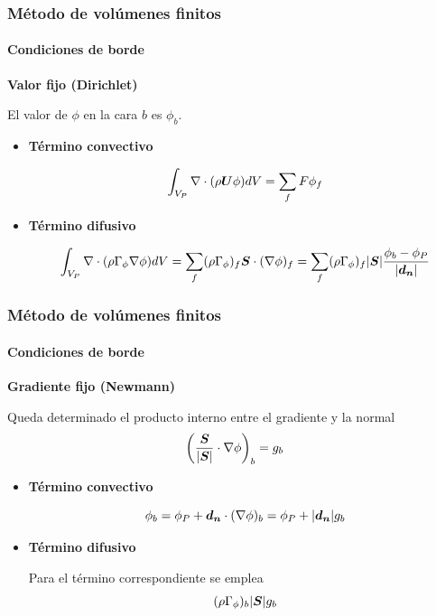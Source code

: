 \begin{frame}
    \frametitle{M\'etodo de vol\'umenes finitos}
    \framesubtitle{Condiciones de borde}

    \textbf{Valor fijo (Dirichlet)}

    El valor de $\phi$ en la cara $b$ es $\phi_b$.

    \begin{itemize}

    \item \textbf{T\'ermino convectivo}

      $$ \int_{V_{P}} \nabla \cdot (\rho \boldsymbol{U} \phi) dV = \sum_f F \phi_f $$
      
    \item \textbf{T\'ermino difusivo}

      $$ \int_{V_{P}} \nabla \cdot (\rho \Gamma_{\phi} \nabla \phi) dV = \sum_f (\rho \Gamma_{\phi})_f \boldsymbol{S} \cdot (\nabla \phi)_f = \sum_f (\rho \Gamma_{\phi})_f |\boldsymbol{S}| \frac{\phi_b - \phi_P}{|\boldsymbol{d_n}|} $$
      
    \end{itemize}

\end{frame}




\begin{frame}
    \frametitle{M\'etodo de vol\'umenes finitos}
    \framesubtitle{Condiciones de borde}

    \textbf{Gradiente fijo (Newmann)}

    Queda determinado el producto interno entre el gradiente y la normal
    $$ \left ( \frac{\boldsymbol{S}}{|\boldsymbol{S}|} \cdot \nabla \phi \right )_b = g_b$$

    \begin{itemize}

    \item \textbf{T\'ermino convectivo}

      $$ \phi_b = \phi_P + \boldsymbol{d_n} \cdot (\nabla \phi)_b = \phi_P + |\boldsymbol{d_n}| g_b $$
      
    \item \textbf{T\'ermino difusivo}

      Para el t\'ermino correspondiente se emplea
      $$ (\rho \Gamma_{\phi})_b |\boldsymbol{S}| g_b $$
      
    \end{itemize}

\end{frame}

